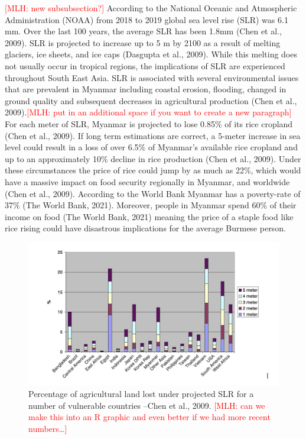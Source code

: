 \documentclass{book}\usepackage{knitr}
\newcommand{\red}[1]{\textcolor{red}{[MLH: #1]}}
\begin{document}
{\red{new subsubsection?}
According to the National Oceanic and Atmospheric Administration (NOAA) from 2018 to 2019 global sea level rise (SLR) was 6.1 mm. Over the last 100 years, the average SLR has been 1.8mm (Chen et al., 2009). SLR is projected to increase up to 5 m by 2100 as a result of melting glaciers, ice sheets, and ice caps (Dasgupta et al., 2009). While this melting does not usually occur in tropical regions, the implications of SLR are experienced throughout South East Asia. SLR is associated with several environmental issues that are prevalent in Myanmar including coastal erosion, flooding, changed in ground quality and subsequent decreases in agricultural production (Chen et al., 2009).\red{put in an additional space if you want to create a new paragraph}
	For each meter of SLR, Myanmar is projected to lose 0.85\% of its rice cropland (Chen et al., 2009). If long term estimations are correct, a 5-meter increase in sea level could result in a loss of over 6.5\% of Myanmar’s available rice cropland and up to an approximately 10\% decline in rice production (Chen et al., 2009). Under these circumstances the price of rice could jump by as much as 22\%, which would have a massive impact on food security regionally in Myanmar, and worldwide (Chen et al., 2009). According to the World Bank Myanmar has a poverty-rate of 37\% (The World Bank, 2021). Moreover, people in Myanmar spend 60\% of their income on food (The World Bank, 2021) meaning the price of a staple food like rice rising could have disastrous implications for the average Burmese person.

\begin{figure}
\includegraphics[width=\linewidth]{images/myanmar/Image6.jpg}
\caption{Percentage of agricultural land lost under projected SLR for a number of vulnerable countries --Chen et al., 2009. \red{can we make this into an R graphic and even better if we had more recent numbers\ldots}}
\end{figure}

}
\end{document}
